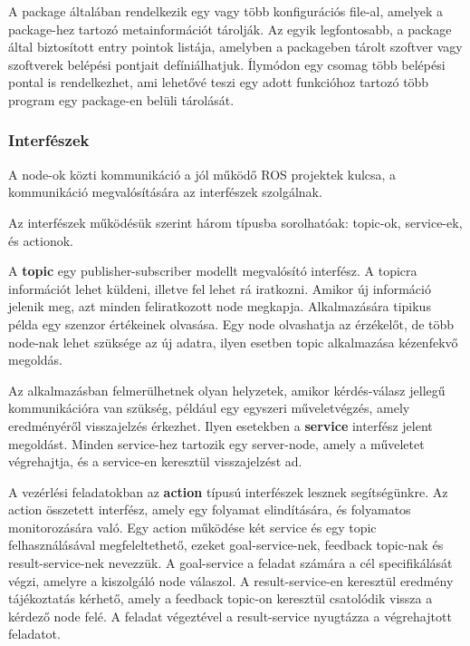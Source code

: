 A package általában rendelkezik egy vagy több konfigurációs file-al, amelyek a
package-hez tartozó metainformációt tárolják. Az egyik legfontosabb, a package
által biztosított entry pointok listája, amelyben a packageben tárolt szoftver
vagy szoftverek belépési pontjait defíniálhatjuk. Ílymódon egy csomag több
belépési pontal is rendelkezhet, ami lehetővé teszi egy adott funkcióhoz tartozó
több program egy package-en belüli tárolását.

\subsubsection{Interfészek}

A node-ok közti kommunikáció a jól működő ROS projektek kulcsa, a kommunikáció
megvalósítására az interfészek szolgálnak.

Az interfészek működésük szerint három típusba sorolhatóak: topic-ok, service-ek,
és actionok.  

\medskip

A \textbf{topic} egy publisher-subscriber modellt megvalósító interfész. A
topicra információt lehet küldeni, illetve fel lehet rá iratkozni. Amikor új
információ jelenik meg, azt minden feliratkozott node megkapja. Alkalmazására
tipikus példa egy szenzor értékeinek olvasása. Egy node olvashatja az érzékelőt,
de több node-nak lehet szüksége az új adatra, ilyen esetben topic alkalmazása
kézenfekvő megoldás.

\medskip

Az alkalmazásban felmerülhetnek olyan helyzetek, amikor kérdés-válasz jellegű
kommunikációra van szükség, például egy egyszeri műveletvégzés, amely
eredményéről visszajelzés érkezhet. Ilyen esetekben a \textbf{service} interfész
jelent megoldást. Minden service-hez tartozik egy server-node, amely a műveletet
végrehajtja, és a service-en keresztül visszajelzést ad.

\medskip

A vezérlési feladatokban az \textbf{action} típusú interfészek lesznek
segítségünkre. Az action összetett interfész, amely egy folyamat elindítására, és
folyamatos monitorozására való. Egy action működése két service és egy topic
felhasználásával megfeleltethető, ezeket goal-service-nek, feedback topic-nak és
result-service-nek nevezzük. A goal-service a feladat számára a cél
specifikálását végzi, amelyre a kiszolgáló node válaszol. A result-service-en
keresztül eredmény tájékoztatás kérhető, amely a feedback topic-on keresztül
csatolódik vissza a kérdező node felé. A feladat végeztével a result-service
nyugtázza a végrehajtott feladatot.

